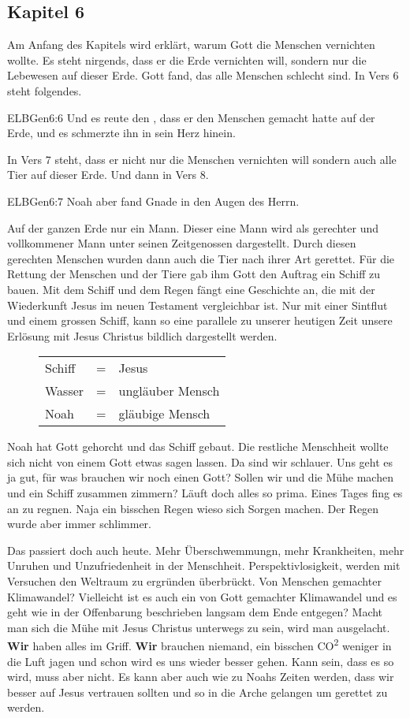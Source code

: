 \subsection{Kapitel 6}
Am Anfang des Kapitels wird erklärt, warum Gott die Menschen vernichten wollte. Es steht nirgends, dass er die Erde vernichten will, sondern nur die Lebewesen auf dieser Erde. Gott fand, das alle Menschen schlecht sind. In Vers 6 steht folgendes.
\begin{bibeltext}{ELB}{Gen}{6:6}
	Und es reute den \herr , dass er den Menschen gemacht hatte auf der Erde, und es schmerzte ihn in sein Herz hinein.
\end{bibeltext}
In Vers 7 steht, dass er nicht nur die Menschen vernichten will sondern auch alle Tier auf dieser Erde. Und dann in Vers 8.
\begin{bibeltext}{ELB}{Gen}{6:7}
	Noah aber fand Gnade in den Augen des Herrn.
\end{bibeltext}
Auf der ganzen Erde nur ein Mann. Dieser eine Mann wird als gerechter und vollkommener Mann unter seinen Zeitgenossen dargestellt. Durch diesen gerechten Menschen wurden dann auch die Tier nach ihrer Art gerettet. Für die Rettung der Menschen und der Tiere gab ihm Gott den Auftrag ein Schiff zu bauen. Mit dem Schiff und dem Regen fängt eine Geschichte an, die mit der Wiederkunft Jesus im neuen Testament vergleichbar ist. Nur mit einer Sintflut und einem grossen Schiff, kann so eine parallele zu unserer heutigen Zeit unsere Erlösung mit Jesus Christus bildlich dargestellt werden.
\begin{figure}[ht]
	\begin{tabular}{lcl}
		Schiff & = & Jesus            \\
		Wasser & = & ungläuber Mensch \\
		Noah   & = & gläubige Mensch  \\
	\end{tabular}
\end{figure}
Noah hat Gott gehorcht und das Schiff gebaut. Die restliche Menschheit wollte sich nicht von einem Gott etwas sagen lassen. Da sind wir schlauer. Uns geht es ja gut, für was brauchen wir noch einen Gott? Sollen wir und die Mühe machen und ein Schiff zusammen zimmern? Läuft doch alles so prima. Eines Tages fing es an zu regnen. Naja ein bisschen Regen wieso sich Sorgen machen. Der Regen wurde aber immer schlimmer.

Das passiert doch auch heute. Mehr Überschwemmungn, mehr Krankheiten, mehr Unruhen und Unzufriedenheit in der Menschheit. Perspektivlosigkeit, werden mit Versuchen den Weltraum zu ergründen überbrückt. Von Menschen gemachter Klimawandel? Vielleicht ist es auch ein von Gott gemachter Klimawandel und es geht wie in der Offenbarung beschrieben langsam dem Ende entgegen? Macht man sich die Mühe mit Jesus Christus unterwegs zu sein, wird man ausgelacht. \textbf{Wir} haben alles im Griff. \textbf{Wir} brauchen niemand, ein bisschen CO\textsuperscript{2} weniger in die Luft jagen und schon wird es uns wieder besser gehen. Kann sein, dass es so wird, muss aber nicht. Es kann aber auch wie zu Noahs Zeiten werden, dass wir besser auf Jesus vertrauen sollten und so in die Arche gelangen um gerettet zu werden.
